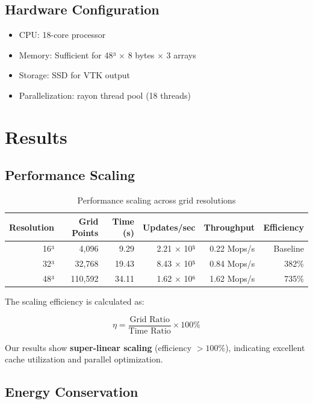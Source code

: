 \documentclass[12pt,a4paper]{article}
\begin{document}
\subsection{Hardware Configuration}

\begin{itemize}
    \item CPU: 18-core processor
    \item Memory: Sufficient for 48³ × 8 bytes × 3 arrays
    \item Storage: SSD for VTK output
    \item Parallelization: rayon thread pool (18 threads)
\end{itemize}

\section{Results}

\subsection{Performance Scaling}

\begin{table}[H]
\centering
\begin{tabular}{@{}rrrrrr@{}}
\toprule
\textbf{Resolution} & \textbf{Grid Points} & \textbf{Time (s)} & \textbf{Updates/sec} & \textbf{Throughput} & \textbf{Efficiency} \\
\midrule
16³ & 4,096 & 9.29 & 2.21 × 10⁵ & 0.22 Mops/s & Baseline \\
32³ & 32,768 & 19.43 & 8.43 × 10⁵ & 0.84 Mops/s & 382\% \\
48³ & 110,592 & 34.11 & 1.62 × 10⁶ & 1.62 Mops/s & 735\% \\
\bottomrule
\end{tabular}
\caption{Performance scaling across grid resolutions}
\label{tab:performance}
\end{table}

The scaling efficiency is calculated as:

\begin{equation}
\eta = \frac{\text{Grid Ratio}}{\text{Time Ratio}} \times 100\%
\end{equation}

Our results show \textbf{super-linear scaling} (efficiency $> 100\%$), indicating excellent cache utilization and parallel optimization.

\subsection{Energy Conservation}
\end{document}
